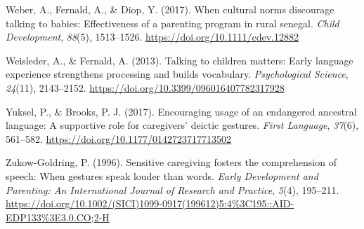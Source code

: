 \documentclass[
  english,
  man,floatsintext]{apa6}
\begin{document}
\leavevmode\hypertarget{ref-weber_when_2017}{}%
Weber, A., Fernald, A., \& Diop, Y. (2017). When cultural norms discourage talking to babies: Effectiveness of a parenting program in rural senegal. \emph{Child Development}, \emph{88}(5), 1513--1526. \url{https://doi.org/10.1111/cdev.12882}

\leavevmode\hypertarget{ref-weisleder_talking_2013}{}%
Weisleder, A., \& Fernald, A. (2013). Talking to children matters: Early language experience strengthens processing and builds vocabulary. \emph{Psychological Science}, \emph{24}(11), 2143--2152. \url{https://doi.org/10.3399/096016407782317928}

\leavevmode\hypertarget{ref-yuksel_encouraging_2017}{}%
Yuksel, P., \& Brooks, P. J. (2017). Encouraging usage of an endangered ancestral language: A supportive role for caregivers' deictic gestures. \emph{First Language}, \emph{37}(6), 561--582. \url{https://doi.org/10.1177/0142723717713502}

\leavevmode\hypertarget{ref-zukow-goldring_sensitive_1996}{}%
Zukow-Goldring, P. (1996). Sensitive caregiving fosters the comprehension of speech: When gestures speak louder than words. \emph{Early Development and Parenting: An International Journal of Research and Practice}, \emph{5}(4), 195--211. \url{https://doi.org/10.1002/(SICI)1099-0917(199612)5:4\%3C195::AID-EDP133\%3E3.0.CO;2-H}
\end{document}
